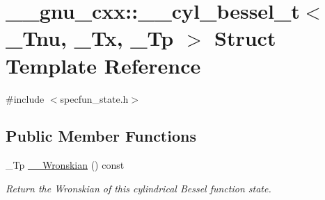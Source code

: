 \hypertarget{struct____gnu__cxx_1_1____cyl__bessel__t}{}\section{\+\_\+\+\_\+gnu\+\_\+cxx\+:\+:\+\_\+\+\_\+cyl\+\_\+bessel\+\_\+t$<$ \+\_\+\+Tnu, \+\_\+\+Tx, \+\_\+\+Tp $>$ Struct Template Reference}
\label{struct____gnu__cxx_1_1____cyl__bessel__t}


{\ttfamily \#include $<$specfun\+\_\+state.\+h$>$}

\subsection*{Public Member Functions}
\begin{DoxyCompactItemize}
\item 
\+\_\+\+Tp \hyperlink{struct____gnu__cxx_1_1____cyl__bessel__t_aa311a0f4636243a07d0c1d0660e5c213}{\+\_\+\+\_\+\+Wronskian} () const
\begin{DoxyCompactList}\small\item\em Return the Wronskian of this cylindrical Bessel function state. \end{DoxyCompactList}\end{DoxyCompactItemize}
